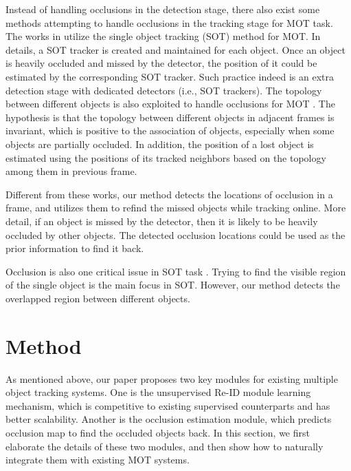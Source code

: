 \documentclass[final,1p,times,twocolumn]{elsarticle}
\begin{document}
	Instead of handling occlusions in the detection stage, there also exist some methods \cite{chu2017online,zhu2018online,chu2019online, chu2020dasot,xu2019spatial,liugsm} attempting to handle occlusions in the tracking stage for MOT task. The works in \cite{chu2017online,chu2020dasot,zhu2018online,chu2019online} utilize the single object tracking (SOT) method for MOT. In details, a SOT tracker is created and maintained for each object. Once an object is heavily occluded and missed by the detector, the position of it could be estimated by the corresponding SOT tracker. Such practice indeed is an extra detection stage with dedicated detectors (i.e., SOT trackers). The topology between different objects is also exploited to handle occlusions for MOT \cite{xu2019spatial,liugsm}. The hypothesis is that the topology between different objects in adjacent frames is invariant, which is positive to the association of objects, especially when some objects are partially occluded. In addition, the position of a lost object is estimated using the positions of its tracked neighbors \cite{liugsm} based on the topology among them in previous frame. 

	Different from these works, our method detects the locations of occlusion in a frame, and utilizes them to refind the missed objects while tracking online. More detail, if an object is missed by the detector, then it is likely to be heavily occluded by other objects. The detected occlusion locations could be used as the prior information to find it back.
	
	
	Occlusion is also one critical issue in SOT task \cite{tu2021novel, dong2020clnet}. Trying to find the visible region of the single object is the main focus in SOT. However, our method detects the overlapped region between different objects.
	
\section{Method}
	\label{section_method}
	As mentioned above, our paper proposes two key modules for existing multiple object tracking systems. One is the unsupervised Re-ID module learning mechanism, which is competitive to existing supervised counterparts and has better scalability. Another is the occlusion estimation module, 
	which predicts occlusion map to find the occluded objects back.
	In this section, we first elaborate the details of these two modules, and then show how to naturally integrate them with existing MOT systems.
	
\end{document}
